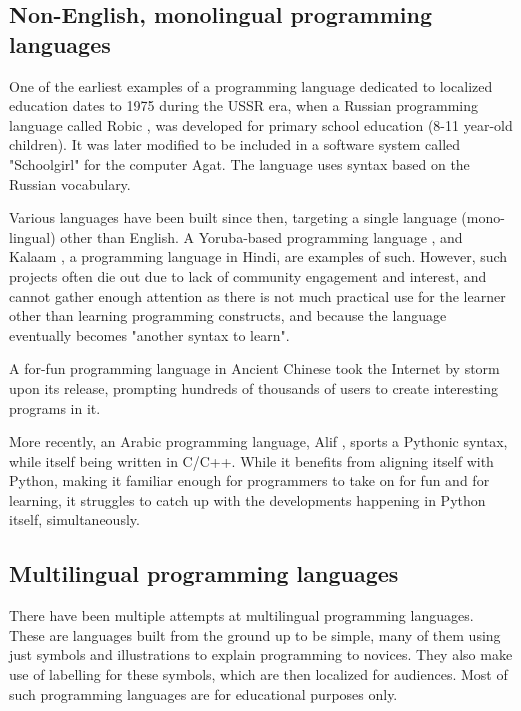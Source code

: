 \documentclass[conference]{IEEEtran}
\begin{document}
\subsection{Non-English, monolingual programming languages}

One of the earliest examples of a programming language dedicated to localized education dates to 1975 during the USSR era, when a Russian programming language called Robic \cite{Robik_Programming_Language}, was developed for primary school education (8-11 year-old children). It was later modified to be included in a software system called "Schoolgirl" for the computer Agat. The language uses syntax based on the Russian vocabulary.

Various languages have been built since then, targeting a single language (mono-lingual) other than English. A Yoruba-based programming language \cite{african_native_language}, and Kalaam \cite{Kalam_Programming_Language}, a programming language in Hindi, are examples of such. However, such projects often die out due to lack of community engagement and interest, and cannot gather enough attention as there is not much practical use for the learner other than learning programming constructs, and because the language eventually becomes "another syntax to learn".

A for-fun programming language in Ancient Chinese \cite{wenyan_lang} took the Internet by storm upon its release, prompting hundreds of thousands of users to create interesting programs in it.

More recently, an Arabic programming language, Alif \cite{alif_language}, sports a Pythonic syntax, while itself being written in C/C++. While it benefits from aligning itself with Python, making it familiar enough for programmers to take on for fun and for learning, it struggles to catch up with the developments happening in Python itself, simultaneously.

\subsection{Multilingual programming languages}

There have been multiple attempts at multilingual programming languages. These are languages built from the ground up to be simple, many of them using just symbols and illustrations to explain programming to novices. They also make use of labelling for these symbols, which are then localized for audiences. Most of such programming languages are for educational purposes only.
\end{document}

